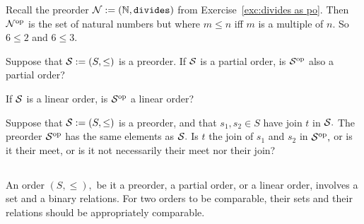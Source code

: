 \documentclass[../main/CT4S-EN-RU]{subfiles}
\begin{document}
\begin{definitionRUS}\label{def:opposite order}
\end{definitionRUS}

\begin{exampleENG}
Recall the preorder $\mathcal{N}:=({\mathbb N},{\tt divides})$ from Exercise~\ref{exc:divides as po}. Then $\mathcal{N}^\textnormal{op}$ is the set of natural numbers but where $m\leq n$ iff $m$ is a multiple of $n.$ So $6\leq 2$ and $6\leq 3.$
\end{exampleENG}

\begin{exampleRUS}
\end{exampleRUS}

\begin{exerciseENG}
Suppose that $\mathcal{S}:=(S,\leq)$ is a preorder. 
\sexc If $\mathcal{S}$ is a partial order, is $\mathcal{S}^\textnormal{op}$ also a partial order? 
\item If $\mathcal{S}$ is a linear order, is $\mathcal{S}^\textnormal{op}$ a linear order?
\endsexc
\end{exerciseENG}

\begin{exerciseRUS}
\end{exerciseRUS}

\begin{exerciseENG}
Suppose that $\mathcal{S}:=(S,\leq)$ is a preorder, and that $s_1,s_2\in S$ have join $t$ in $\mathcal{S}.$ The preorder $\mathcal{S}^\textnormal{op}$ has the same elements as $\mathcal{S}.$ Is $t$ the join of $s_1$ and $s_2$ in $\mathcal{S}^\textnormal{op},$ or is it their meet, or is it not necessarily their meet nor their join?
\end{exerciseENG}

\begin{exerciseRUS}
\end{exerciseRUS}


\subsection{}

\begin{blockENG}
An order $(S,\leq),$ be it a preorder, a partial order, or a linear order, involves a set and a binary relations. For two orders to be comparable, their sets and their relations should be appropriately comparable.
\end{blockENG}
\end{document}
